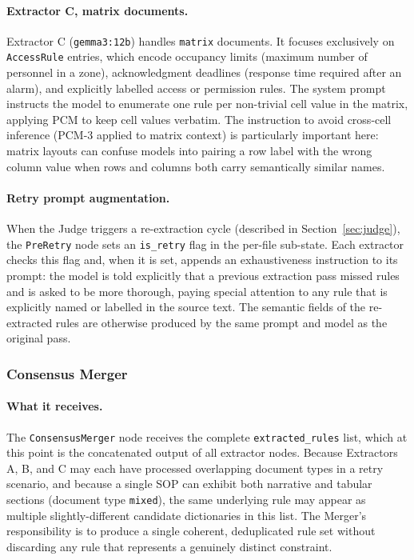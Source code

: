 ﻿\documentclass[11pt]{article}
\begin{document}
\paragraph{Extractor C, matrix documents.}
Extractor C (\texttt{gemma3:12b}) handles \texttt{matrix} documents.  It focuses
exclusively on \texttt{AccessRule} entries, which encode occupancy limits
(maximum number of personnel in a zone), acknowledgment deadlines (response time
required after an alarm), and explicitly labelled access or permission rules.
The system prompt instructs the model to enumerate one rule per non-trivial cell
value in the matrix, applying PCM to keep cell values verbatim.  The instruction
to avoid cross-cell inference (PCM-3 applied to matrix context) is particularly
important here: matrix layouts can confuse models into pairing a row label with
the wrong column value when rows and columns both carry semantically similar names.

\paragraph{Retry prompt augmentation.}
When the Judge triggers a re-extraction cycle (described in
Section~\ref{sec:judge}), the \texttt{PreRetry} node sets an \texttt{is\_retry}
flag in the per-file sub-state.  Each extractor checks this flag and, when it is
set, appends an exhaustiveness instruction to its prompt: the model is told
explicitly that a previous extraction pass missed rules and is asked to be more
thorough, paying special attention to any rule that is explicitly named or
labelled in the source text.  The semantic fields of the re-extracted rules are
otherwise produced by the same prompt and model as the original pass.

\subsubsection{Consensus Merger}
\label{sec:merger}

\paragraph{What it receives.}
The \texttt{ConsensusMerger} node receives the complete \texttt{extracted\_rules}
list, which at this point is the concatenated output of all extractor nodes.
Because Extractors A, B, and C may each have processed overlapping document
types in a retry scenario, and because a single SOP can exhibit both narrative and
tabular sections (document type \texttt{mixed}), the same underlying rule may appear
as multiple slightly-different candidate dictionaries in this list.  The Merger's
responsibility is to produce a single coherent, deduplicated rule set without
discarding any rule that represents a genuinely distinct constraint.
\end{document}
